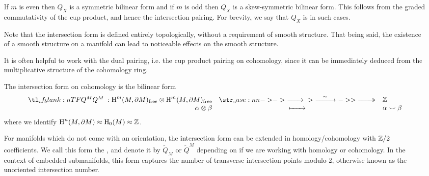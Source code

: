 \begin{remark}
	If $m$ is even then $Q_X$ is a symmetric bilinear form and if $m$ is odd then $Q_X$ is a skew-symmetric bilinear form. This follows from the graded commutativity of the cup product, and hence the intersection pairing. For brevity, we say that $Q_X$ is  in such cases.
\end{remark}

\begin{remark}
	Note that the intersection form is defined entirely topologically, without a requirement of smooth structure. That being said, the existence of a smooth structure on a manifold can lead to noticeable effects on the smooth structure.
\end{remark}

It is often helpful to work with the dual pairing, i.e. the cup product pairing on cohomology, since it can be immediately deduced from the multiplicative structure of the cohomology ring.
\begin{definition}
	The intersection form on cohomology is the bilinear form
	\begin{equation}
		\lkxfunc{Q^M}{\H^m(M,\partial M)_{\mathrm{free}}\otimes \H^m(M,\partial M)_{\mathrm{free}}}{\Z}{\alpha\otimes \beta}{\alpha\smile \beta}
	\end{equation}
	where we identify $\operatorname{H}^n(M,\partial M)\approx \operatorname{H}_0(M)\approx \mathbb{Z}$.
\end{definition}

\begin{remark}
	For manifolds which do not come with an orientation, the intersection form can be extended in homology/cohomology with $\mathbb{Z}/2$ coefficients. We call this form the , and denote it by $\widetilde{Q}_M$ or $\widetilde{Q}^M$ depending on if we are working with homology or cohomology. In the context of embedded submanifolds, this form captures the number of transverse intersection points modulo 2, otherwise known as the unoriented intersection number.
\end{remark}

